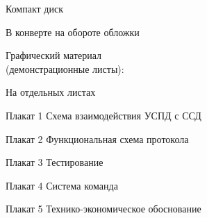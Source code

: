 


 
 
 
 
 \newpage
 \tableofcontents
 \vspace{1cm}
 \begin{minipage}[left]{0.6\linewidth}
  Компакт диск
 \end{minipage}
 \hfill
 \begin{minipage}[right]{0.3\linewidth}
  В конверте на обороте обложки 
 \end{minipage}
 
 \vspace{1cm}
 
 \begin{minipage}[left]{0.6\linewidth}
  Графический материал \\ (демонстрационные листы):
 \end{minipage}
 \hfill
 \begin{minipage}[right]{0.3\linewidth}
  На отдельных листах
 \end{minipage}
 
 \vspace{1cm}
 
 Плакат 1 Схема взаимодействия УСПД с ССД
 
 Плакат 2 Функциональная схема протокола

 Плакат 3 Тестирование
 
 Плакат 4 Система команда 
 
 Плакат 5 Технико-экономическое обоснование
 
 
 
 
 
 
 \newpage
 \renewcommand{\refname}{\hfill Список использованных источников \hfill}
 
 


